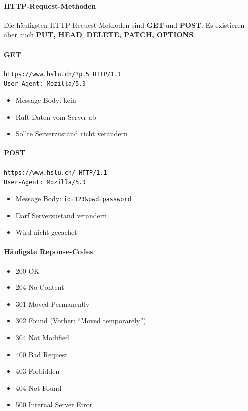 \documentclass[10pt,a4paper]{article}
\begin{document}
\paragraph*{HTTP-Request-Methoden}Die häufigsten HTTP-Request-Methoden sind \textbf{GET} und \textbf{POST}.
Es existieren aber auch \textbf{PUT, HEAD, DELETE, PATCH, OPTIONS}.
\paragraph*{GET}\texttt{https://www.hslu.ch/?p=5 HTTP/1.1\\User-Agent: Mozilla/5.0}
\begin{itemize}[noitemsep,topsep=0pt,leftmargin=*]
    \item Message Body: kein
    \item Ruft Daten vom Server ab
    \item Sollte Serverzustand nicht verändern
\end{itemize}
\paragraph*{POST}\texttt{https://www.hslu.ch/ HTTP/1.1\\
User-Agent: Mozilla/5.0}
\begin{itemize}[noitemsep,topsep=0pt,leftmargin=*]
    \item Message Body: \texttt{id=123\&pwd=password}
    \item Darf Serverzustand verändern
    \item Wird nicht gecachet
\end{itemize}
\paragraph*{Häufigste Reponse-Codes}
\begin{itemize}[noitemsep,topsep=0pt,leftmargin=*]
    \item 200 OK
    \item 204 No Content
    \item 301 Moved Permanently
    \item 302 Found (Vorher: "`Moved temporarely"')
    \item 304 Not Modified
    \item 400 Bad Request
    \item 403 Forbidden
    \item 404 Not Found
    \item 500 Internal Server Error
\end{itemize}
\end{document}
